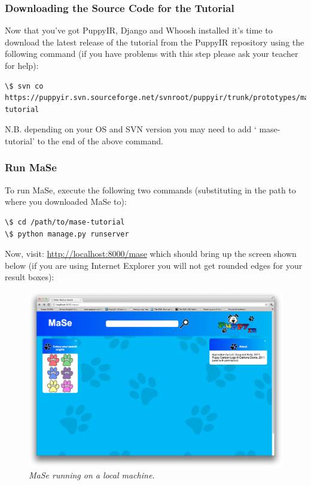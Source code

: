 \documentclass[letterpaper,10pt,english]{sphinxmanual}
\begin{document}
\subsubsection{Downloading the Source Code for the Tutorial}
\label{mase-tutorial:downloading-the-source-code-for-the-tutorial}
Now that you've got PuppyIR, Django and Whoosh installed it's time to download the latest release of the tutorial from the PuppyIR repository using the following command (if you have problems with this step please ask your teacher for help):

\begin{Verbatim}[commandchars=\\\{\}]
\$ svn co https://puppyir.svn.sourceforge.net/svnroot/puppyir/trunk/prototypes/mase-tutorial
\end{Verbatim}

N.B. depending on your OS and SVN version you may need to add ` mase-tutorial' to the end of the above command.


\subsubsection{Run MaSe}
\label{mase-tutorial:run-mase}
To run MaSe, execute the following two commands (substituting in the path to where you downloaded MaSe to):

\begin{Verbatim}[commandchars=\\\{\}]
\$ cd /path/to/mase-tutorial
\$ python manage.py runserver
\end{Verbatim}

Now, visit: \href{http://localhost:8000/mase}{http://localhost:8000/mase} which should bring up the screen shown below (if you are using Internet Explorer you will not get rounded edges for your result boxes):
\begin{figure}[htbp]
\centering
\capstart

\includegraphics{mase-1-initial.png}
\caption{\emph{MaSe running on a local machine.}}\end{figure}
\end{document}
